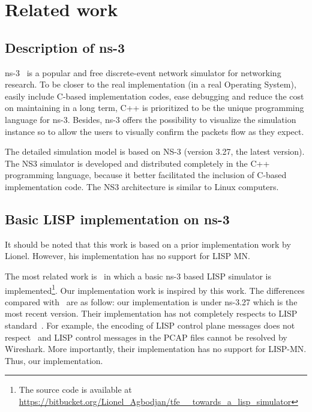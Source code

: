 \section{Related work}
\label{sec:ns3_related_work}
 \subsection{Description of ns-3}
 \label{sec:ns3_ns3}
 ns-3~\cite{ns3} is a popular and free discrete-event network simulator for networking research. To be closer to the real implementation (in a real Operating System), easily include C-based implementation codes, ease debugging and reduce the cost on maintaining in a long term, C++ is prioritized to be the unique programming language for ns-3. Besides, ns-3 offers the possibility to visualize the simulation instance so to allow the users to visually confirm the packets flow as they expect.



The detailed simulation model is based on NS-3 (version 3.27, the latest version). The NS3 simulator is developed and distributed completely in the C++ programming language, because it better facilitated the inclusion of C-based implementation code. The NS3 architecture is similar to Linux computers.

\subsection{Basic LISP implementation on ns-3}
\label{sec:ns3_basic_lisp}
It should be noted that this work is based on a prior implementation work by Lionel. However, his implementation has no support for LISP MN.


The most related work is~\cite{lionel2016} in which a basic ns-3 based LISP simulator is implemented\footnote{The source code is available at \url{https://bitbucket.org/Lionel_Agbodjan/tfe__towards_a_lisp_simulator}}. Our implementation work is inspired by this work. The differences compared with~\cite{lionel2016} are as follow: our implementation is under ns-3.27 which is the most recent version. Their implementation has not completely respects to LISP standard~\cite{rfc6830}. For example, the encoding of LISP control plane messages does not respect~\cite{rfc6830} and LISP control messages in the PCAP files cannot be resolved by Wireshark. More importantly, their implementation has no support for LISP-MN. Thus, our implementation.  


